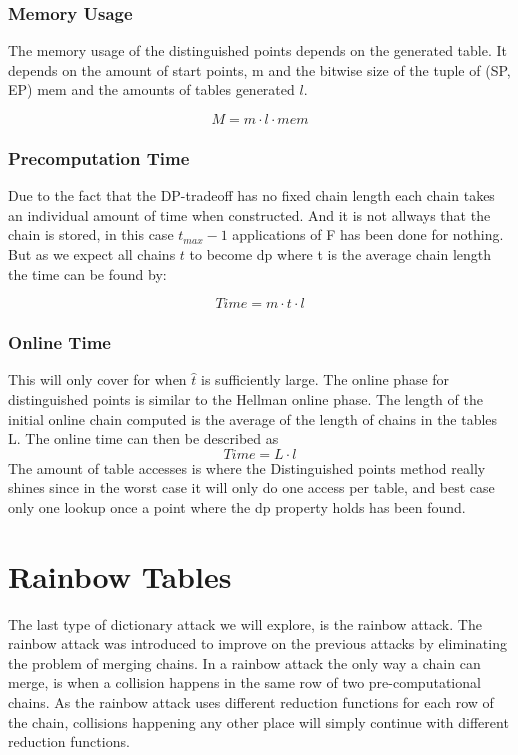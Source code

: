 \subsubsection{Memory Usage}
The memory usage of the distinguished points depends on the generated table. It depends on the amount of start points, m and the bitwise size of the tuple of (SP, EP) mem and the amounts of tables generated $l$.

\begin{equation}
  M=m\cdot l \cdot mem
\end{equation}

\subsubsection{Precomputation Time}
Due to the fact that the DP-tradeoff has no fixed chain length each chain takes an individual amount of time when constructed. And it is not allways that the chain is stored, in this case $t_{max}-1$ applications of F has been done for nothing. But as we expect all chains $t$ to become dp where t is the average chain length the time can be found by:

\begin{equation}
  Time = m \cdot t \cdot l
\end{equation}

\subsubsection{Online Time}
This will only cover for when $\hat{t}$ is sufficiently large.
The online phase for distinguished points is similar to the Hellman
online phase. The length of the initial online chain computed is the
average of the length of chains in the tables L. The online time can
then be described as
\begin{equation}
  Time=L\cdot l
\end{equation}
The amount of table accesses is where the Distinguished points method really shines since in the worst case it will only do one access per table, and best case only one lookup once a point where the dp property holds has been found.

\section{Rainbow Tables}
\label{sec:raintheory}

The last type of dictionary attack we will explore, is the rainbow
attack. The rainbow attack was introduced to improve on the previous
attacks by eliminating the problem of merging chains. In a rainbow
attack the only way a chain can merge, is when a collision happens in
the same row of two pre-computational chains. As the rainbow attack uses different
reduction functions for each row of the chain, collisions happening
any other place will simply continue with different reduction
functions.

